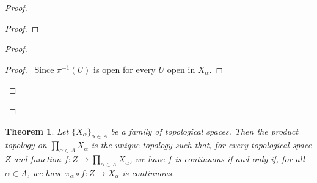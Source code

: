 \documentclass{book}
\let\qed\relax
\newtheorem{thm}[ax]{Theorem}
\theoremstyle{definition}
\newcommand{\inv}[1]{\ensuremath{{#1}^{-1}}}
\begin{document}
\begin{proof}
\pf
{}
\begin{proof}
	\step{c}{$B = \inv{\pi_{\alpha_1}}(U_{\alpha_1}) \cap \cdots \cap \inv{\pi_{\alpha_n}}(U_{\alpha_n})$}
\end{proof}
\begin{proof}
	\begin{proof}
		\pf\ Since $\inv{\pi}(U)$ is open for every $U$ open in $X_\alpha$.
	\end{proof}
\end{proof}
\qed
\end{proof}

\begin{thm}
\label{thm:product_universal}
Let $\{ X_\alpha \}_{\alpha \in A}$ be a family of topological spaces. Then the product topology on $\prod_{\alpha \in A} X_\alpha$ is the unique topology such that, for every topological space $Z$ and function $f : Z \rightarrow \prod_{\alpha \in A} X_\alpha$, we have $f$ is continuous if and only if, for all $\alpha \in A$, we have $\pi_\alpha \circ f : Z \rightarrow X_\alpha$ is continuous.
\end{thm}
\end{document}
